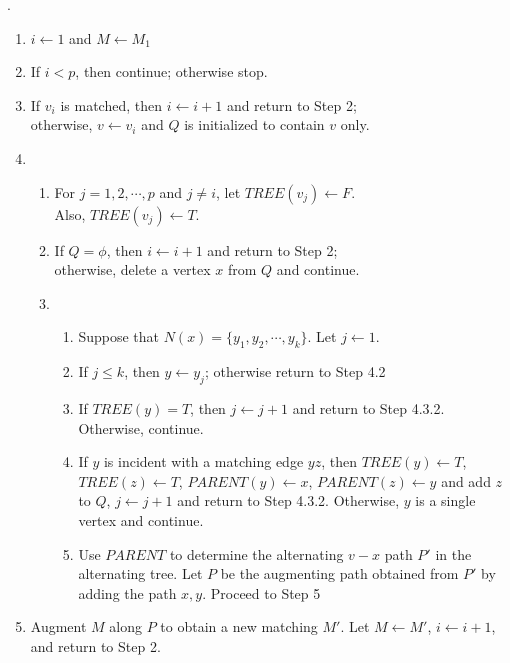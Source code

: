 \begin{algorithm}.
	\begin{enumerate}
		\item $ i \leftarrow 1$ and $M \leftarrow M_1$
		\item If $i < p$, then continue; otherwise stop.
		\item If $v_i$ is matched, then $i \leftarrow i+1$ and return to Step 2;\\
			otherwise, $v \leftarrow v_i$ and $Q$ is initialized to contain $v$ only.
		\item 
			\begin{enumerate}[label=(\arabic*)]
				\item For $j = 1,2,\cdots,p$ and $j \ne i$, let $TREE(v_j) \leftarrow F$.\\
					Also, $TREE(v_j) \leftarrow T$.
				\item If $Q = \phi$, then $i \leftarrow i+1$ and return to Step 2;\\
					otherwise, delete a vertex $x$ from $Q$ and continue.
				\item 
					\begin{enumerate}[label=(\arabic*)]
						\item Suppose that $N(x) = \{y_1,y_2,\cdots,y_k\}$. Let $j \leftarrow 1$.
						\item If $j \le k$, then $y \leftarrow y_j$; otherwise return to Step 4.2
						\item If $TREE(y) = T$, then $j \leftarrow j+1$ and return to Step 4.3.2. Otherwise, continue.
						\item If $y$ is incident with a matching edge $yz$, then $TREE(y) \leftarrow T$, $TREE(z) \leftarrow T$, $PARENT(y) \leftarrow x$, $PARENT(z) \leftarrow y$ and add $z$ to $Q$, $j \leftarrow j+1$ and return to Step 4.3.2. Otherwise, $y$ is a single vertex and continue.
						\item Use $PARENT$ to determine the alternating $v-x$ path $P'$ in the alternating tree. Let $P$ be the augmenting path obtained from $P'$ by adding the path $x,y$. Proceed to Step 5
					\end{enumerate}
			\end{enumerate}
		\item Augment $M$ along $P$ to obtain a new matching $M'$. Let $M \leftarrow M'$, $i \leftarrow i+1$, and return to Step 2.
	\end{enumerate}
	\label{alg:maxmatching}
\end{algorithm}

